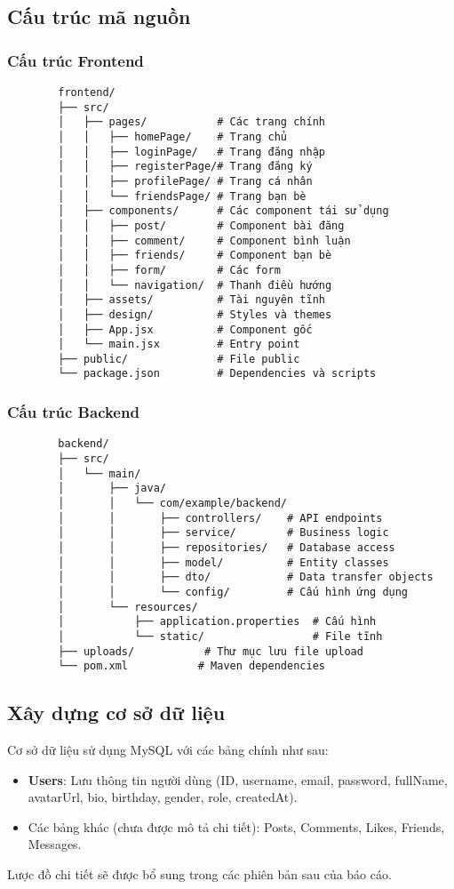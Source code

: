 \documentclass[a4paper,12pt]{article}
\begin{document}
	\subsection{Cấu trúc mã nguồn}
	
	\subsubsection{Cấu trúc Frontend}
	\begin{verbatim}
		frontend/
		├── src/
		│   ├── pages/           # Các trang chính
		│   │   ├── homePage/    # Trang chủ
		│   │   ├── loginPage/   # Trang đăng nhập
		│   │   ├── registerPage/# Trang đăng ký
		│   │   ├── profilePage/ # Trang cá nhân
		│   │   └── friendsPage/ # Trang bạn bè
		│   ├── components/      # Các component tái sử dụng
		│   │   ├── post/        # Component bài đăng
		│   │   ├── comment/     # Component bình luận
		│   │   ├── friends/     # Component bạn bè
		│   │   ├── form/        # Các form
		│   │   └── navigation/  # Thanh điều hướng
		│   ├── assets/          # Tài nguyên tĩnh
		│   ├── design/          # Styles và themes
		│   ├── App.jsx          # Component gốc
		│   └── main.jsx         # Entry point
		├── public/              # File public
		└── package.json         # Dependencies và scripts
	\end{verbatim}
	
	\subsubsection{Cấu trúc Backend}
	\begin{verbatim}
		backend/
		├── src/
		│   └── main/
		│       ├── java/
		│       │   └── com/example/backend/
		│       │       ├── controllers/    # API endpoints
		│       │       ├── service/        # Business logic
		│       │       ├── repositories/   # Database access
		│       │       ├── model/          # Entity classes
		│       │       ├── dto/            # Data transfer objects
		│       │       └── config/         # Cấu hình ứng dụng
		│       └── resources/
		│           ├── application.properties  # Cấu hình
		│           └── static/                 # File tĩnh
		├── uploads/           # Thư mục lưu file upload
		└── pom.xml           # Maven dependencies
	\end{verbatim}
	
	\subsection{Xây dựng cơ sở dữ liệu}
	Cơ sở dữ liệu sử dụng MySQL với các bảng chính như sau:
	\begin{itemize}
		\item \textbf{Users}: Lưu thông tin người dùng (ID, username, email, password, fullName, avatarUrl, bio, birthday, gender, role, createdAt).
		\item Các bảng khác (chưa được mô tả chi tiết): Posts, Comments, Likes, Friends, Messages.
	\end{itemize}
	Lược đồ chi tiết sẽ được bổ sung trong các phiên bản sau của báo cáo.
	
\end{document}
